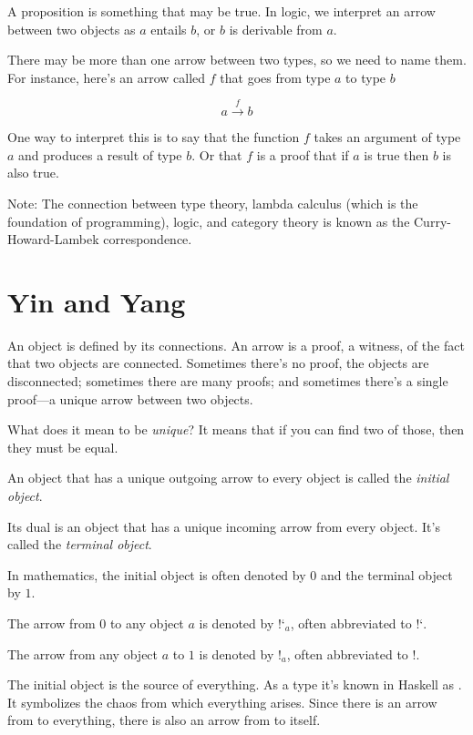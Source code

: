 \documentclass[DaoFP]{subfiles}
\begin{document}
A proposition is something that may be true. In logic, we interpret an arrow between two objects as $a$ entails $b$, or $b$ is derivable from $a$. 
\pagebreak

There may be more than one arrow between two types, so we need to name them. For instance, here's an arrow called $f$ that goes from type $a$ to type $b$

\[ a \xrightarrow f b \]

One way to interpret this is to say that the function $ f$ takes an argument of type $a$ and produces a result of type $b$. Or that $ f$ is a proof that if $a$ is true then $b$ is also true.

Note: The connection between type theory, lambda calculus (which is the foundation of programming), logic, and category theory is known as the Curry-Howard-Lambek correspondence.

\section{Yin and Yang}

An object is defined by its connections. An arrow is a proof, a witness, of the fact that two objects are connected. Sometimes there's no proof, the objects are disconnected; sometimes there are many proofs; and sometimes there's a single proof---a unique arrow between two objects.

What does it mean to be \emph{unique}? It means that if you can find two of those, then they must be equal.

An object that has a unique outgoing arrow to every object is called the \emph{initial object}.

Its dual is an object that has a unique incoming arrow from every object. It's called the \emph{terminal object}. 

In mathematics, the initial object is often denoted by $0$ and the terminal object by $1$.

The arrow from $0$ to any object $a$ is denoted by $\mbox{!`}_a$, often abbreviated to $\mbox{!`}$.

The arrow from any object $a$ to $1$ is denoted by $!_a$, often abbreviated to $!$.

The initial object is the source of everything. As a type it's known in Haskell as . It symbolizes the chaos from which everything arises. Since there is an arrow from  to everything, there is also an arrow from  to itself. 
\end{document}
